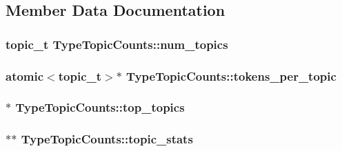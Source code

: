 \subsection{Member Data Documentation}
\hypertarget{class_type_topic_counts_a11093a2580f604279b5799ef494a8e66}{
\subsubsection[{num\_\-topics}]{\setlength{\rightskip}{0pt plus 5cm}topic\_\-t {\bf TypeTopicCounts::num\_\-topics}}}
\label{class_type_topic_counts_a11093a2580f604279b5799ef494a8e66}
\hypertarget{class_type_topic_counts_ab1fcbc4b5558d7d8df4404d5db290e8d}{
\subsubsection[{tokens\_\-per\_\-topic}]{\setlength{\rightskip}{0pt plus 5cm}atomic$<$topic\_\-t$>$$\ast$ {\bf TypeTopicCounts::tokens\_\-per\_\-topic}}}
\label{class_type_topic_counts_ab1fcbc4b5558d7d8df4404d5db290e8d}
\hypertarget{class_type_topic_counts_aa31724ba039f4e58d2ac2d3344b94d46}{
\subsubsection[{top\_\-topics}]{ $\ast$ {\bf TypeTopicCounts::top\_\-topics}}}
\label{class_type_topic_counts_aa31724ba039f4e58d2ac2d3344b94d46}
\hypertarget{class_type_topic_counts_a1fd0fdd37107d5837fe5cc78191f5e8a}{
\subsubsection[{topic\_\-stats}]{$\ast$$\ast$ {\bf TypeTopicCounts::topic\_\-stats}}}
\label{class_type_topic_counts_a1fd0fdd37107d5837fe5cc78191f5e8a}


